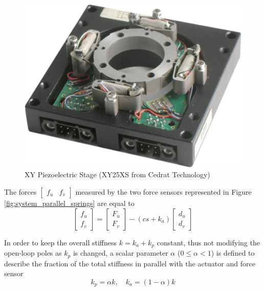 \documentclass[Afour,sagev,times]{sagej}
\begin{document}
\begin{figure}[htbp]
\centering
\includegraphics[width=0.8\linewidth]{figs/cedrat_xy25xs.png}
\caption{\label{fig:cedrat_xy25xs}XY Piezoelectric Stage (XY25XS from Cedrat Technology)}
\end{figure}

\par
The forces \(\begin{bmatrix}f_u & f_v\end{bmatrix}\) measured by the two force sensors represented in Figure \ref{fig:system_parallel_springs} are equal to
\begin{equation}
\label{eq:measured_force_kp}
  \begin{bmatrix} f_{u} \\ f_{v} \end{bmatrix} =
  \begin{bmatrix} F_u \\ F_v \end{bmatrix} - (c s + k_a)
  \begin{bmatrix} d_u \\ d_v \end{bmatrix}
\end{equation}

In order to keep the overall stiffness \(k = k_a + k_p\) constant, thus not modifying the open-loop poles as \(k_p\) is changed, a scalar parameter \(\alpha\) (\(0 \le \alpha < 1\)) is defined to describe the fraction of the total stiffness in parallel with the actuator and force sensor
\begin{equation}
  k_p = \alpha k, \quad k_a = (1 - \alpha) k
\end{equation}
\end{document}
